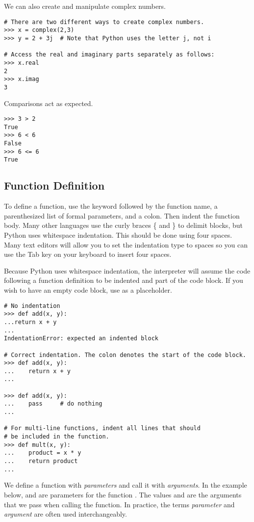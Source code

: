 We can also create and manipulate complex numbers.
\begin{lstlisting}
# There are two different ways to create complex numbers.
>>> x = complex(2,3)
>>> y = 2 + 3j	# Note that Python uses the letter j, not i

# Access the real and imaginary parts separately as follows:
>>> x.real
2
>>> x.imag
3
\end{lstlisting}

Comparisons act as expected.
\begin{lstlisting}
>>> 3 > 2
True
>>> 6 < 6
False
>>> 6 <= 6
True
\end{lstlisting}


\subsection*{Function Definition}
To define a function, use the  keyword followed by the function name, a parenthesized list of formal parameters, and a colon.
Then indent the function body.
Many other languages use the curly braces \{ and \} to delimit blocks, but Python uses whitespace indentation.
This should be done using four spaces.
Many text editors will allow you to set the indentation type to spaces so you can use the Tab key on your keyboard to insert four spaces.

Because Python uses whitespace indentation, the interpreter will assume the code following a function definition to be indented and part of the code block.
If you wish to have an empty code block, use  as a placeholder.
\begin{lstlisting}
# No indentation
>>> def add(x, y):
...return x + y
...
IndentationError: expected an indented block

# Correct indentation. The colon denotes the start of the code block.
>>> def add(x, y):
...    return x + y
...

>>> def add(x, y):
...    pass		# do nothing
...

# For multi-line functions, indent all lines that should
# be included in the function.
>>> def mult(x, y):
...    product = x * y
...    return product
...
\end{lstlisting}

We define a function with \emph{parameters} and call it with \emph{arguments}. In the example below,  and  are parameters for the function . The values  and  are the arguments that we pass when calling the function. In practice, the terms \emph{parameter} and \emph{argument} are often used interchangeably.

